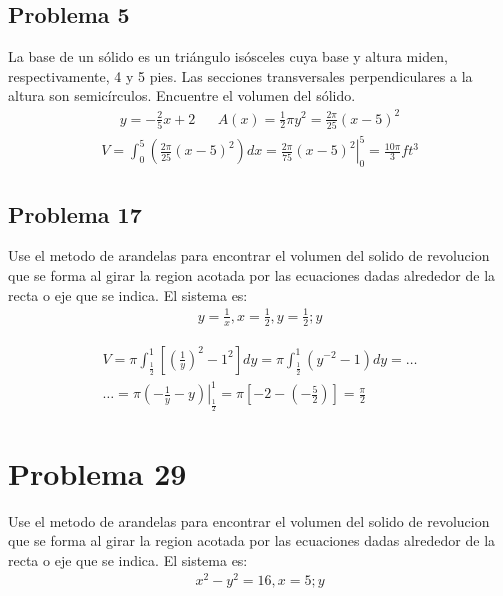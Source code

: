 \documentclass{article}
\begin{document}
\subsection{Problema 5}
La base de un sólido es un triángulo isósceles cuya base y altura miden, respectivamente, 4 y 5 pies. Las secciones transversales perpendiculares a la altura son semicírculos. Encuentre el volumen del sólido.
\begin{align*}
  y = -\frac{2}{5}x+2 &  & A(x) = \frac{1}{2}\pi y^2 = \frac{2\pi}{25}(x-5)^2
\end{align*}
\begin{align*}
  V= \int_{0}^{5} \left(\frac{2\pi}{25}(x-5)^2 \right)dx = \left.\frac{2\pi}{75}(x-5)^2 \right|_0^5 =\frac{10\pi}{3}ft^3
\end{align*}

\subsection{Problema 17}
Use el metodo de arandelas para encontrar el volumen del solido de revolucion que se forma al girar la region acotada por las ecuaciones dadas alrededor de la recta o eje que se indica.
El sistema es:
\begin{align*}
  y = \frac{1}{x}, x = \frac{1}{2},y = \frac{1}{2} ; y
\end{align*}
\begin{center}
\end{center}
\begin{align*}
  V = \pi \int_{\frac{1}{2}}^{1}\left[\left(\frac{1}{y}\right)^2-1^2\right]dy = \pi\int_{\frac{1}{2}}^{1}(y^{-2}-1)dy = \dots \\ \dots = \pi\left.\left(-\frac{1}{y}-y\right)\right|_{\frac{1}{2}}^1 = \pi \left[-2-\left(-\frac{5}{2}\right)\right] = \frac{\pi}{2}
\end{align*}
\section{Problema 29}
Use el metodo de arandelas para encontrar el volumen del solido de revolucion que se forma al girar la region acotada por las ecuaciones dadas alrededor de la recta o eje que se indica.
El sistema es:
\begin{align*}
  x^2-y^2=16,x=5;y
\end{align*}
\end{document}
